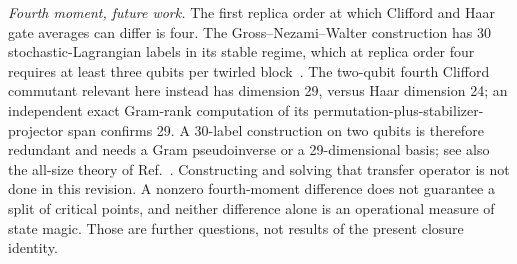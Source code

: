 \emph{Fourth moment, future work.} The first replica order at which Clifford and Haar gate averages can differ is four. The Gross--Nezami--Walter construction has 30 stochastic-Lagrangian labels in its stable regime, which at replica order four requires at least three qubits per twirled block~\cite{GrossNezamiWalter2021}. The two-qubit fourth Clifford commutant relevant here instead has dimension 29, versus Haar dimension 24; an independent exact Gram-rank computation of its permutation-plus-stabilizer-projector span confirms 29. A 30-label construction on two qubits is therefore redundant and needs a Gram pseudoinverse or a 29-dimensional basis; see also the all-size theory of Ref.~\cite{Bittel2026}. Constructing and solving that transfer operator is not done in this revision. A nonzero fourth-moment difference does not guarantee a split of critical points, and neither difference alone is an operational measure of state magic. Those are further questions, not results of the present closure identity.
